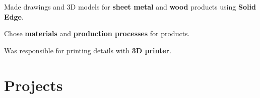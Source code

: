 \documentclass[letterpaper]{deedy-resume} %
\begin{document}
\begin{minipage}[t]{0.66\textwidth}
\sectionspace %



\begin{tightitemize}
  \item Made drawings and 3D models for \textbf{sheet metal} and \textbf{wood} products using \textbf{Solid Edge}.
  \item Chose \textbf{materials} and \textbf{production processes} for products.
  \item Was responsible for printing details with \textbf{3D printer}.
\end{tightitemize}

\sectionspace %



\section{Projects}

%
%




\end{minipage}
\end{document}
